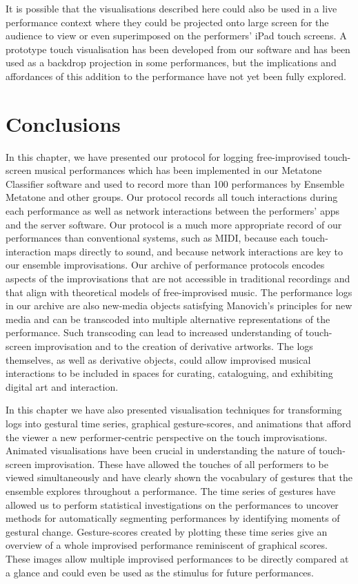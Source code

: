 \documentclass[graybox]{svmult}
\begin{document}
It is possible that the visualisations described here could also be used in a live
performance context where they could be projected onto large screen for the audience to
view or even superimposed on the performers' iPad touch screens. A
prototype touch visualisation has been developed from our software and
has been used as a backdrop projection in some performances, but the
implications and affordances of this addition to the performance have
not yet been fully explored.

\section{Conclusions}

In this chapter, we have presented our protocol for logging
free-improvised touch-screen musical performances which has been
implemented in our Metatone Classifier software and used to record
more than 100 performances by Ensemble Metatone and other groups. Our
protocol records all touch interactions during each performance as
well as network interactions between the performers' apps and the
server software. Our protocol is a much more appropriate record of our
performances than conventional systems, such as MIDI, because each
touch-interaction maps directly to sound, and because network
interactions are key to our ensemble improvisations. Our archive of
performance protocols encodes aspects of the improvisations that are
not accessible in traditional recordings and that align with
theoretical models of free-improvised music. The performance logs in
our archive are also new-media objects satisfying Manovich's principles
for new media and can be transcoded into multiple alternative
representations of the performance. Such transcoding can lead to
increased understanding of touch-screen improvisation and to the
creation of derivative artworks.
The logs themselves, as well as derivative objects, could allow
improvised musical interactions to be included in spaces for curating,
cataloguing, and exhibiting digital art and interaction.

In this chapter we have also presented visualisation techniques for
transforming logs into gestural time series, graphical gesture-scores,
and animations that afford the viewer a new performer-centric
perspective on the touch improvisations. Animated visualisations have
been crucial in understanding the nature of touch-screen
improvisation. These have allowed the touches of all performers to be
viewed simultaneously and have clearly shown the vocabulary of
gestures that the ensemble explores throughout a performance. The time
series of gestures have allowed us to perform statistical
investigations on the performances to uncover methods for
automatically segmenting performances by identifying moments of
gestural change. Gesture-scores created by plotting these time series
give an overview of a whole improvised performance reminiscent of
graphical scores. These images allow multiple improvised performances
to be directly compared at a glance and could even be used as the
stimulus for future performances.
\end{document}
